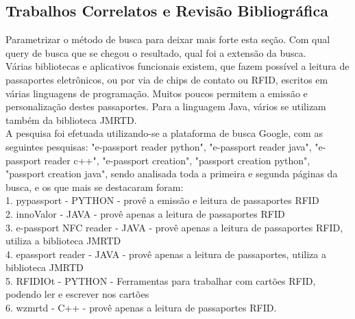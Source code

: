 \documentclass{article}
\begin{document}
	\subsection{Trabalhos Correlatos e Revisão Bibliográfica}
		\begin{justify}
			Parametrizar o método de busca para deixar mais forte esta seção. Com qual query de busca que se chegou o resultado, qual foi a extensão da busca.\\
			\hspace{2cm} Várias bibliotecas e aplicativos funcionais existem, que fazem possível a leitura de passaportes eletrônicos, ou por via de chips de contato ou RFID, escritos em várias linguagens de programação. Muitos poucos permitem a emissão e personalização destes passaportes. Para a linguagem Java, vários se utilizam também da biblioteca JMRTD. \\
			\hspace*{2cm}A pesquisa foi efetuada utilizando-se a plataforma de busca Google, com as seguintes pesquisas: "e-passport reader python", "e-passport reader java", "e-passport reader c++", "e-passport creation", "passport creation python", "passport creation java", sendo analisada toda a primeira e segunda páginas da busca, e os que mais se destacaram foram:\\
			\hspace*{2cm}1. pypassport\parencite{PYPASSPORT} - PYTHON - provê a emissão e leitura de passaportes RFID \\
			\hspace*{2cm}2. innoValor\parencite{INNOVALOR} - JAVA - provê apenas a leitura de passaportes RFID\\
			\hspace*{2cm}3. e-passport NFC reader\parencite{TANANAEV} - JAVA - provê apenas a leitura de passaportes RFID, utiliza a biblioteca JMRTD\\
			\hspace*{2cm}4. epassport reader\parencite{GLAMDRING} - JAVA - provê apenas a leitura de passaportes, utiliza a biblioteca JMRTD \\
			\hspace*{2cm}5. RFIDIOt\parencite{RFIDIOT} - PYTHON - Ferramentas para trabalhar com cartões RFID, podendo ler e escrever nos cartões\\
			\hspace*{2cm}6. wzmrtd\parencite{WZMRTD} - C++ - provê apenas a leitura de passaportes RFID.


		\end{justify}
\end{document}

